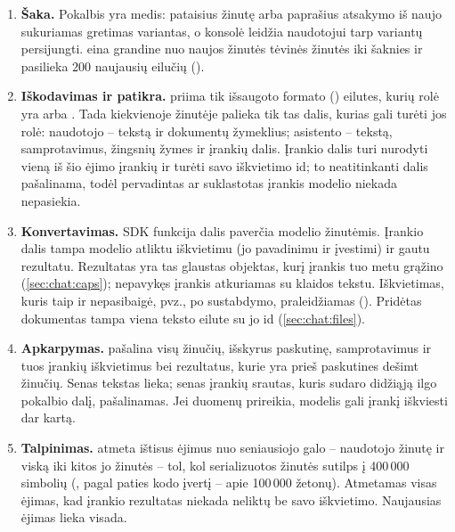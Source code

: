 \begin{enumerate}
  \item \textbf{Šaka.} Pokalbis yra medis: pataisius žinutę arba paprašius atsakymo iš naujo
    sukuriamas gretimas variantas, o konsolė leidžia naudotojui tarp variantų persijungti.
     eina  grandine nuo naujos žinutės tėvinės žinutės iki
    šaknies ir pasilieka 200 naujausių eilučių ().
  \item \textbf{Iškodavimas ir patikra.}  priima tik išsaugoto formato
    () eilutes, kurių rolė yra  arba . Tada
     kiekvienoje žinutėje palieka tik tas dalis, kurias gali turėti jos
    rolė: naudotojo -- tekstą ir dokumentų žymeklius; asistento -- tekstą, samprotavimus,
    žingsnių žymes ir įrankių dalis. Įrankio dalis turi nurodyti vieną iš šio ėjimo įrankių ir
    turėti savo iškvietimo id; to neatitinkanti dalis pašalinama, todėl pervadintas ar
    suklastotas įrankis modelio niekada nepasiekia.
  \item \textbf{Konvertavimas.} SDK funkcija  dalis paverčia modelio
    žinutėmis. Įrankio dalis tampa modelio atliktu iškvietimu (jo pavadinimu ir įvestimi) ir
    gautu rezultatu. Rezultatas yra tas glaustas objektas, kurį įrankis tuo metu grąžino
    (\cref{sec:chat:caps}); nepavykęs įrankis atkuriamas su klaidos tekstu. Iškvietimas, kuris
    taip ir nepasibaigė, pvz., po sustabdymo, praleidžiamas ().
    Pridėtas dokumentas tampa viena teksto eilute su jo id (\cref{sec:chat:files}).
  \item \textbf{Apkarpymas.}  pašalina visų žinučių, išskyrus paskutinę,
    samprotavimus ir tuos įrankių iškvietimus bei rezultatus, kurie yra prieš paskutines dešimt
    žinučių. Senas tekstas lieka; senas įrankių srautas, kuris sudaro didžiąją ilgo pokalbio dalį,
    pašalinamas. Jei duomenų prireikia, modelis gali įrankį iškviesti dar kartą.
  \item \textbf{Talpinimas.}  atmeta ištisus ėjimus nuo seniausiojo galo --
    naudotojo žinutę ir viską iki kitos jo žinutės -- tol, kol serializuotos žinutės sutilps į
    400\,000 simbolių (, pagal paties kodo įvertį -- apie 100\,000
    žetonų). Atmetamas visas ėjimas, kad įrankio rezultatas niekada neliktų be savo iškvietimo.
    Naujausias ėjimas lieka visada.
\end{enumerate}

